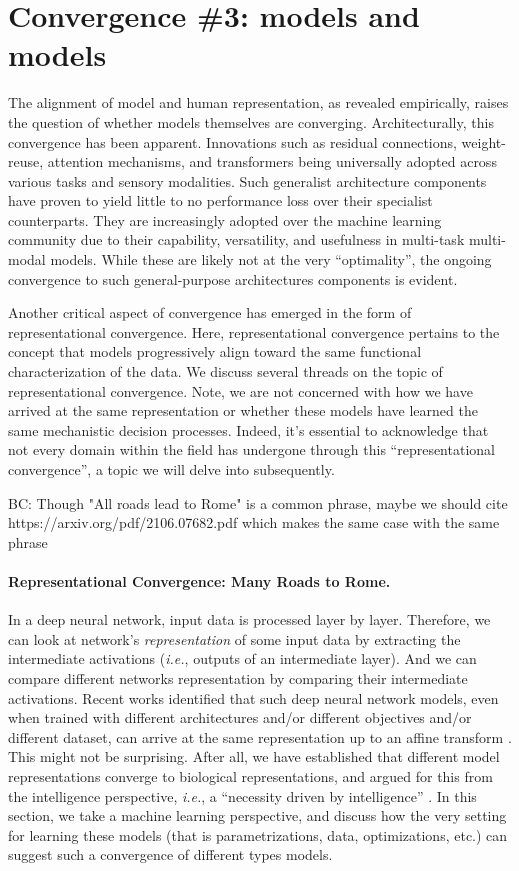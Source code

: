 \documentclass{article}
\newcommand{\bc}[1]{{\color{olive}BC: #1}}
\theoremstyle{plain}
\theoremstyle{definition}
\theoremstyle{remark}
\begin{document}
\section{Convergence \#3: models and models}

The alignment of model and human representation, as revealed empirically, raises the question of whether models themselves are converging. Architecturally, this convergence has been apparent. Innovations such as residual connections, weight-reuse, attention mechanisms, and transformers being universally adopted across various tasks and sensory modalities. 
Such generalist architecture components have proven to yield little to no performance loss over their specialist counterparts. They are increasingly adopted over the machine learning community due to their capability, versatility, and usefulness in multi-task multi-modal models. While these are likely not at the very ``optimality'', the ongoing convergence to such general-purpose architectures components is evident.


Another critical aspect of convergence has emerged in the form of representational convergence. Here, representational convergence pertains to the concept that models progressively align toward the same functional characterization of the data. We discuss several threads on the topic of representational convergence.
Note, we are not concerned with how we have arrived at the same representation or whether these models have learned the same mechanistic decision processes. Indeed, it's essential to acknowledge that not every domain within the field has undergone through this ``representational convergence'', a topic we will delve into subsequently.


\bc{Though "All roads lead to Rome" is a common phrase, maybe we should cite https://arxiv.org/pdf/2106.07682.pdf which makes the same case with the same phrase}
\paragraph{Representational Convergence: Many Roads to Rome.}

In a deep neural network, input data is processed layer by layer. Therefore, we can look at network's \emph{representation} of some input data by extracting the intermediate activations (\emph{i.e.}, outputs of an intermediate layer). And we can compare different networks representation by comparing their intermediate activations. 
Recent works identified that such deep neural network models, even when trained with different architectures and/or different objectives and/or different dataset, can arrive at the same representation up to an affine transform \citep{moschella2022relative,klabunde2023similarity}. This might not be surprising. After all, we have established that different model representations converge to biological representations, and argued for this from the intelligence perspective, \emph{i.e.}, a ``necessity driven by intelligence'' .  In this section, we take a machine learning perspective, and discuss how the very setting for learning these models (that is parametrizations, data, optimizations, etc.) can suggest such a convergence of different types models.
\end{document}
